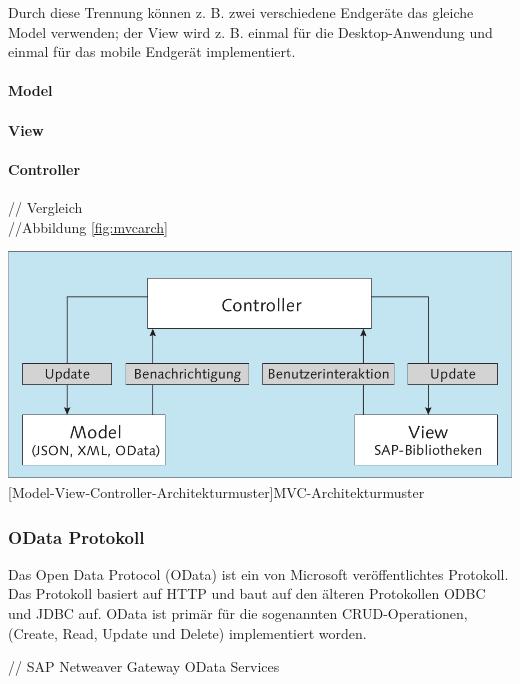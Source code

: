 \documentclass[12pt,a4paper,bibliography=totocnumbered,listof=totocnumbered]{scrartcl}
\begin{document}
Durch diese Trennung können z. B. zwei verschiedene Endgeräte das gleiche Model verwenden; der View wird z. B. einmal für die Desktop-Anwendung und einmal für das mobile Endgerät implementiert.\grqq{}\cite[S.123]{AntoEinf2014}

\paragraph{Model}

\paragraph{View}

\paragraph{Controller}
// Vergleich\\

//Abbildung \ref{fig:mvcarch}\\
	\vspace{1em}
	\begin{minipage}{\linewidth}
		\centering
		\includegraphics[width=0.7\linewidth]{images/mvc_arch2.png}
		[Model-View-Controller-Architekturmuster]{MVC-Architekturmuster\cite[S.124]{AntoEinf2014}}
		\label{fig:mvcarch}
	\end{minipage}

\subsubsection{OData Protokoll}
\glqq Das Open Data Protocol (OData) ist ein von Microsoft veröffentlichtes Protokoll. Das Protokoll basiert auf HTTP und baut auf den älteren Protokollen \ac{ODBC} und \ac{JDBC} auf. OData ist primär für die sogenannten CRUD-Operationen, (Create, Read, Update und Delete) implementiert worden.\grqq{}\cite[S.168]{AntoEinf2014}

// SAP Netweaver Gateway OData Services\\
\pagebreak
\end{document}
